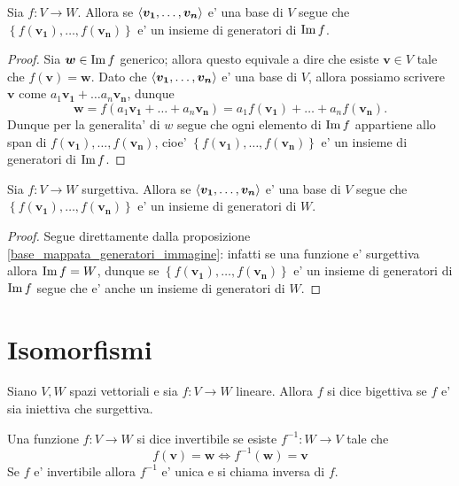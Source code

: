 \begin{proposition}\label{base_mappata_generatori_immagine}
    Sia $f : V \to W$. Allora se $\left\langle \bm{v_1}, \dots, \bm{v_n} \right\rangle$ e' una base di $V$ segue che $\left\{ f(\bm{v_1}), \dots, f(\bm{v_n})\right\}$ e' un insieme di generatori di $\operatorname{Im}f$.
\end{proposition}
\begin{proof}
    Sia $\bm{w} \in \operatorname{Im}f$ generico; allora questo equivale a dire che esiste $\bm{v} \in V$ tale che $f(\bm{v}) = \bm{w}$.
    Dato che $\left\langle \bm{v_1}, \dots, \bm{v_n} \right\rangle$ e' una base di $V$, allora possiamo scrivere $\bm{v}$ come $a_1\bm{v_1} + \dots a_n\bm{v_n}$, dunque 
    \begin{equation*}
        \bm{w} = f(a_1\bm{v_1} + \dots + a_n\bm{v_n}) = a_1f(\bm{v_1}) + \dots + a_nf(\bm{v_n}).
    \end{equation*}
    Dunque per la generalita' di $w$ segue che ogni elemento di $\operatorname{Im}f$ appartiene allo span di $f(\bm{v_1}), \dots, f(\bm{v_n})$, cioe' $\left\{ f(\bm{v_1}), \dots, f(\bm{v_n})\right\}$ e' un insieme di generatori di $\operatorname{Im}f$.
\end{proof}

\begin{corollary}\label{base_mappata_generatori_codominio}
    Sia $f : V \to W$ surgettiva. Allora se $\left\langle \bm{v_1}, \dots, \bm{v_n} \right\rangle$ e' una base di $V$ segue che $\left\{ f(\bm{v_1}), \dots, f(\bm{v_n})\right\}$ e' un insieme di generatori di $W$.
\end{corollary}
\begin{proof}
    Segue direttamente dalla proposizione \ref{base_mappata_generatori_immagine}: infatti se una funzione e' surgettiva allora $\operatorname{Im}f = W$, dunque se $\left\{ f(\bm{v_1}), \dots, f(\bm{v_n})\right\}$ e' un insieme di generatori di $\operatorname{Im}f$ segue che e' anche un insieme di generatori di $W$.
\end{proof}

\section{Isomorfismi}

\begin{definition}
    Siano $V, W$ spazi vettoriali e sia $f : V \to W$ lineare. Allora $f$ si dice bigettiva se $f$ e' sia iniettiva che surgettiva.
\end{definition}

\begin{definition}
    Una funzione $f : V \to W$ si dice invertibile se esiste $f^{-1} : W \to V$ tale che \begin{equation}
        f(\bm{v}) = \bm{w} \iff f^{-1}(\bm{w}) = \bm{v}
    \end{equation}
    Se $f$ e' invertibile allora $f^{-1}$ e' unica e si chiama inversa di $f$.
\end{definition}

